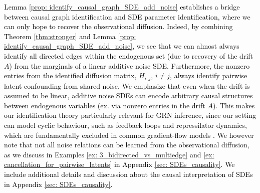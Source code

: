 \documentclass[twoside,11pt]{article}
\newcommand{\rv}[1]{\textcolor{black}{#1}}
\begin{document}
\rv{Lemma \ref{prop: identify_causal_graph_SDE_add_noise} establishes a bridge between causal graph identification and SDE parameter identification, where we can only hope to recover the observational diffusion. Indeed, by combining Theorem \ref{thm:stronger} and Lemma \ref{prop: identify_causal_graph_SDE_add_noise}, we see that we can almost always identify all directed edges within the endogenous set (due to recovery of the drift $A$) from the marginals of a linear additive noise SDE. Furthermore, the nonzero entries from the identified diffusion matrix, $H_{i,j}$, $i \neq j$, always identify pairwise latent confounding from shared noise. We emphasize that even when the drift is assumed to be linear, additive noise SDEs can encode arbitrary causal structures between endogenous variables (ex. via nonzero entries in the drift $A$). This makes our identification theory particularly relevant for GRN inference, since our setting can model cyclic behaviour, such as feedback loops and repressilator dynamics, which are fundamentally excluded in common gradient-flow models
\citep{weinreb2018fundamental, hashimoto2016learning, lavenant2021towards, terpin2024learning, guan2025gradient}. We however note that not all noise relations can be learned from the observational diffusion, as we discuss in Examples \ref{ex: 3_bidirected_vs_multiedge} and \ref{ex: cancellation_for_pairwise_latents} in Appendix \ref{sec: SDEs_causality}.
We include additional details and discussion about the causal interpretation of SDEs in Appendix \ref{sec: SDEs_causality}.}





\end{document}

